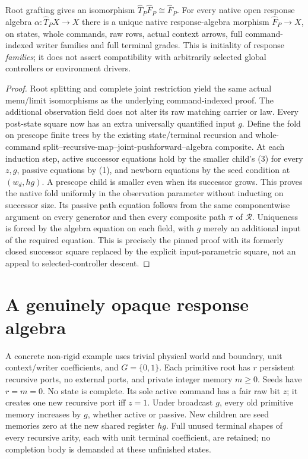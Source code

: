 \documentclass[11pt]{article}
\begin{document}
\begin{theorem}
Root grafting gives an isomorphism $\widehat T_P\widehat F_P\cong\widehat F_P$. For every native open response algebra $\alpha:\widehat T_PX\to X$ there is a unique native response-algebra morphism $\widehat F_P\to X$, on states, whole commands, raw rows, actual context arrows, full command-indexed writer families and full terminal grades. This is initiality of response \emph{families}; it does not assert compatibility with arbitrarily selected global controllers or environment drivers.
\end{theorem}
\begin{proof}
Root splitting and complete joint restriction yield the same actual menu/limit isomorphisms as the underlying command-indexed proof. The additional observation field does not alter its raw matching carrier or law. Every post-state square now has an extra universally quantified input $g$. Define the fold on prescope finite trees by the existing state/terminal recursion and whole-command split--recursive-map--joint-pushforward--algebra composite. At each induction step, active successor equations hold by the smaller child's (3) for every $z,g$, passive equations by (1), and newborn equations by the seed condition at $(w_d,hg)$. A prescope child is smaller even when its successor grows. This proves the native fold uniformly in the observation parameter without inducting on successor size. Its passive path equation follows from the same componentwise argument on every generator and then every composite path $\pi$ of $\mathcal R$. Uniqueness is forced by the algebra equation on each field, with $g$ merely an additional input of the required equation. This is precisely the pinned proof with its formerly closed successor square replaced by the explicit input-parametric square, not an appeal to selected-controller descent.\end{proof}

\section{A genuinely opaque response algebra}
A concrete non-rigid example uses trivial physical world and boundary, unit context/writer coefficients, and $G=\{0,1\}$. Each primitive root has $r$ persistent recursive ports, no external ports, and private integer memory $m\geq0$. Seeds have $r=m=0$. No state is complete. Its sole active command has a fair raw bit $z$; it creates one new recursive port iff $z=1$. Under broadcast $g$, every old primitive memory increases by $g$, whether active or passive. New children are seed memories zero at the new shared register $hg$. Full unused terminal shapes of every recursive arity, each with unit terminal coefficient, are retained; no completion body is demanded at these unfinished states.
\end{document}
